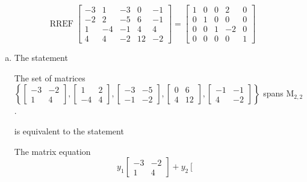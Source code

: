 \begin{exerciseAnswer} 


\[\operatorname{RREF} \left[\begin{array}{ccccc}
-3 & 1 & -3 & 0 & -1 \\
-2 & 2 & -5 & 6 & -1 \\
1 & -4 & -1 & 4 & 4 \\
4 & 4 & -2 & 12 & -2
\end{array}\right] = \left[\begin{array}{ccccc}
1 & 0 & 0 & 2 & 0 \\
0 & 1 & 0 & 0 & 0 \\
0 & 0 & 1 & -2 & 0 \\
0 & 0 & 0 & 0 & 1
\end{array}\right] \]


\begin{enumerate}[(a)]
\item The statement 
\begin{center}\begin{minipage}{0.8\textwidth}
 The set of matrices \( \left\{ \left[\begin{array}{cc}
-3 & -2 \\
1 & 4
\end{array}\right] , \left[\begin{array}{cc}
1 & 2 \\
-4 & 4
\end{array}\right] , \left[\begin{array}{cc}
-3 & -5 \\
-1 & -2
\end{array}\right] , \left[\begin{array}{cc}
0 & 6 \\
4 & 12
\end{array}\right] , \left[\begin{array}{cc}
-1 & -1 \\
4 & -2
\end{array}\right] \right\} \) spans \(\mathrm{M}_{2,2}\). 
\end{minipage}\end{center}
     is equivalent to the statement 
\begin{center}\begin{minipage}{0.8\textwidth}
 The matrix equation \[ y_{1} \left[\begin{array}{cc}
-3 & -2 \\
1 & 4
\end{array}\right] + y_{2} \left[\begin{array}{cc}

\end{array}\]
\end{minipage}
\end{center}
\end{enumerate}
\end{exerciseAnswer}
